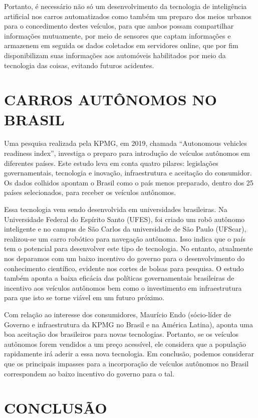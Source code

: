 \documentclass[a4paper, 12pt]{article}
\begin{document}
    Portanto, é necessário não só um desenvolvimento da tecnologia de inteligência artificial nos carros automatizados como também um preparo dos meios urbanos para o concedimento destes veículos, para que ambos possam compartilhar informações mutuamente, por meio de sensores que captam informações e armazenem em seguida os dados coletados em servidores online, que por fim disponibilizam suas informações aos automóveis habilitados por meio da tecnologia das coisas, evitando futuros acidentes.
 \newpage
\section{CARROS AUTÔNOMOS NO BRASIL}

    Uma pesquisa realizada pela KPMG, em 2019, chamada “Autonomous vehicles readiness index”, investiga o preparo para introdução de veículos autônomos em diferentes países. Este estudo leva em conta quatro pilares: legislações governamentais, tecnologia e inovação, infraestrutura e aceitação do consumidor. Os dados colhidos apontam o Brasil como o país menos preparado, dentro dos 25 países selecionados, para receber os veículos autônomos.

    Essa tecnologia vem sendo desenvolvida em universidades brasileiras. Na Universidade Federal do Espírito Santo (UFES), foi criado um robô autônomo inteligente e no campus de São Carlos da universidade de São Paulo (UFScar), realizou-se um carro robótico para navegação autônoma. Isso indica que o país tem o potencial para desenvolver este tipo de tecnologia. No entanto, atualmente nos deparamos com um baixo incentivo do governo para o desenvolvimento do conhecimento científico, evidente nos cortes de bolsas para pesquisa. O estudo também aponta a baixa eficácia das políticas governamentais brasileiras de incentivo aos veículos autônomos bem como o investimento em infraestrutura para que isto se torne viável em um futuro próximo.

    Com relação ao interesse dos consumidores, Maurício Endo (sócio-líder de Governo e infraestrutura da KPMG no Brasil e na América Latina), aponta uma boa aceitação dos brasileiros para novas tecnologias. Portanto, se os veículos autônomos forem vendidos a um preço acessível, ele considera que a população rapidamente irá aderir a essa nova tecnologia. Em conclusão, podemos considerar que os principais impasses para a incorporação de veículos autônomos no Brasil correspondem ao baixo incentivo do governo para o tal.  
     \newpage
    \section{CONCLUSÃO}
    
\end{document}
